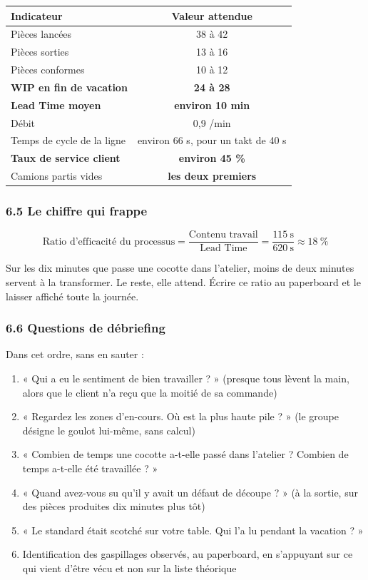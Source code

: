 \documentclass[
]{article}
\newcounter{none} %
\providecommand{\tightlist}{%
  \setlength{\itemsep}{0pt}\setlength{\parskip}{0pt}}
\begin{document}
{\def\LTcaptype{none} %
\begin{longtable}[]{@{}lc@{}}
\toprule\noalign{}
Indicateur & Valeur attendue \\
\midrule\noalign{}
\endhead
\bottomrule\noalign{}
\endlastfoot
Pièces lancées & 38 à 42 \\
Pièces sorties & 13 à 16 \\
Pièces conformes & 10 à 12 \\
\textbf{WIP en fin de vacation} & \textbf{24 à 28} \\
\textbf{Lead Time moyen} & \textbf{environ 10 min} \\
Débit & 0,9 /min \\
Temps de cycle de la ligne & environ 66 s, pour un takt de 40 s \\
\textbf{Taux de service client} & \textbf{environ 45 \%} \\
Camions partis vides & \textbf{les deux premiers} \\
\end{longtable}
}

\subsubsection{6.5 Le chiffre qui frappe}\label{le-chiffre-qui-frappe}

\[
\text{Ratio d'efficacité du processus} = \frac{\text{Contenu travail}}{\text{Lead Time}} = \frac{115\ \text{s}}{620\ \text{s}} \approx 18\ \%
\]

Sur les dix minutes que passe une cocotte dans l'atelier, moins de deux
minutes servent à la transformer. Le reste, elle attend. Écrire ce ratio
au paperboard et le laisser affiché toute la journée.

\subsubsection{6.6 Questions de
débriefing}\label{questions-de-duxe9briefing}

Dans cet ordre, sans en sauter :

\begin{enumerate}
\def\labelenumi{\arabic{enumi}.}
\tightlist
\item
  « Qui a eu le sentiment de bien travailler ? » (presque tous lèvent la
  main, alors que le client n'a reçu que la moitié de sa commande)
\item
  « Regardez les zones d'en-cours. Où est la plus haute pile ? » (le
  groupe désigne le goulot lui-même, sans calcul)
\item
  « Combien de temps une cocotte a-t-elle passé dans l'atelier ? Combien
  de temps a-t-elle été travaillée ? »
\item
  « Quand avez-vous su qu'il y avait un défaut de découpe ? » (à la
  sortie, sur des pièces produites dix minutes plus tôt)
\item
  « Le standard était scotché sur votre table. Qui l'a lu pendant la
  vacation ? »
\item
  Identification des gaspillages observés, au paperboard, en s'appuyant
  sur ce qui vient d'être vécu et non sur la liste théorique
\end{enumerate}
\end{document}
